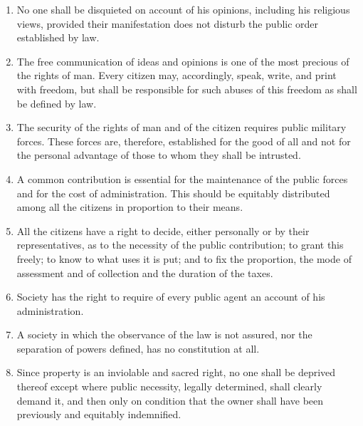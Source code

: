 \documentclass[letterpaper,12pt,twoside]{article}
\begin{document}
\begin{enumerate}
  \item No one shall be disquieted on account of his opinions, including his religious views, provided their manifestation does not disturb the public order established by law.
  \item The free communication of ideas and opinions is one of the most precious of the rights of man. Every citizen may, accordingly, speak, write, and print with freedom, but shall be responsible for such abuses of this freedom as shall be defined by law.
  \item The security of the rights of man and of the citizen requires public military forces. These forces are, therefore, established for the good of all and not for the personal advantage of those to whom they shall be intrusted.
  \item A common contribution is essential for the maintenance of the public forces and for the cost of administration. This should be equitably distributed among all the citizens in proportion to their means.
  \item All the citizens have a right to decide, either personally or by their representatives, as to the necessity of the public contribution; to grant this freely; to know to what uses it is put; and to fix the proportion, the mode of assessment and of collection and the duration of the taxes.
  \item Society has the right to require of every public agent an account of his administration.
  \item A society in which the observance of the law is not assured, nor the separation of powers defined, has no constitution at all.
  \item Since property is an inviolable and sacred right, no one shall be deprived thereof except where public necessity, legally determined, shall clearly demand it, and then only on condition that the owner shall have been previously and equitably indemnified.
\end{enumerate}
\end{document}
